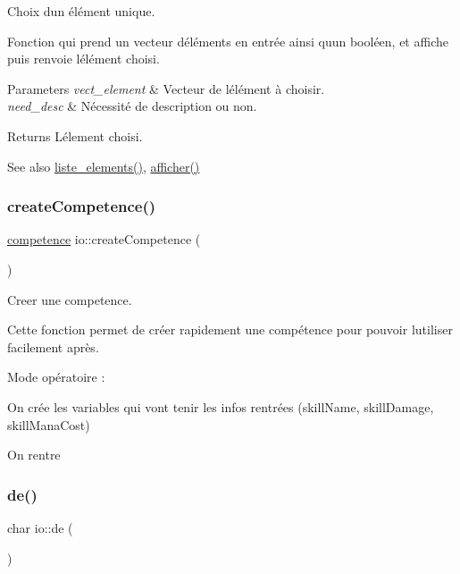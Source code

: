 Choix d\textquotesingle{}un élément unique. 

Fonction qui prend un vecteur d\textquotesingle{}éléments en entrée ainsi qu\textquotesingle{}un booléen, et affiche puis renvoie l\textquotesingle{}élément choisi. 
\begin{DoxyParams}{Parameters}
{\em vect\+\_\+element} & Vecteur de l\textquotesingle{}élément à choisir. \\
\hline
{\em need\+\_\+desc} & Nécessité de description ou non. \\
\hline
\end{DoxyParams}
\begin{DoxyReturn}{Returns}
L\textquotesingle{}élement choisi. 
\end{DoxyReturn}
\begin{DoxySeeAlso}{See also}
\hyperlink{namespaceio_acf5693654c155fd094993bf20ac39343}{liste\+\_\+elements()}, \hyperlink{namespaceio_ac5222293c3d12f7982a8df7ead04ba0b}{afficher()} 
\end{DoxySeeAlso}
\mbox{\label{namespaceio_a474f817675f4aa2e28f1dac572046eb5}} 
\subsubsection{\texorpdfstring{create\+Competence()}{createCompetence()}}
{\footnotesize\ttfamily \hyperlink{classcompetence}{competence} io\+::create\+Competence (\begin{DoxyParamCaption}{ }\end{DoxyParamCaption})}



Creer une competence. 

Cette fonction permet de créer rapidement une compétence pour pouvoir l\textquotesingle{}utiliser facilement après.

Mode opératoire \+:
\begin{DoxyItemize}
\item On crée les variables qui vont tenir les infos rentrées (skill\+Name, skill\+Damage, skill\+Mana\+Cost)
\item On rentre 
\end{DoxyItemize}\mbox{\label{namespaceio_ae9908b55f26f07e78043d7cfad003d22}} 
\subsubsection{\texorpdfstring{de()}{de()}}
{\footnotesize\ttfamily char io\+::de (\begin{DoxyParamCaption}{ }\end{DoxyParamCaption})}



